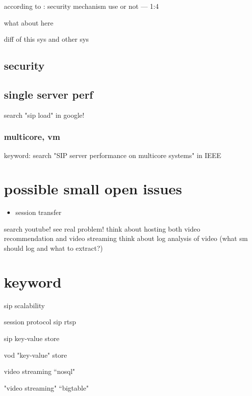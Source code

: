 \documentclass[•]{article}
\begin{document}
according to \cite{Nahum2007}:
security mechanism use or not — 1:4

what about here

diff of this sys and other sys

\subsection{security}

\subsection{single server perf}

search "sip load" in google!

\subsubsection{multicore, vm}
keyword: search "SIP server performance on multicore systems" in IEEE

\section{possible small open issues}
\begin{itemize}
\item session transfer
\end{itemize}

search youtube! see real problem!
think about hosting both video recommendation and video streaming
think about log analysis of video (what sm should log and what to extract?)



\section{keyword}

sip scalability

session protocol sip rtsp

sip key-value store

vod "key-value" store

video streaming “nosql"

"video streaming" “bigtable"




\end{document}
